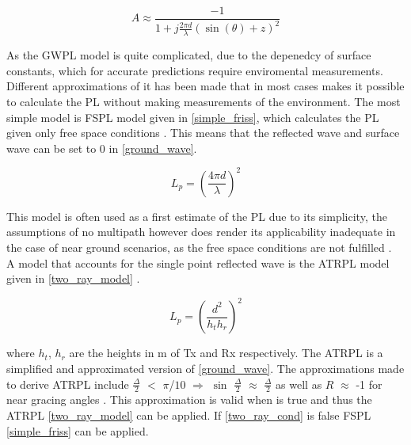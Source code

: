 \begin{equation}
A \approx \frac{-1}{1+j\frac{2\pi d}{\lambda}(\sin(\theta)+z)^{2}}
\label{attenuation_factor_A}
\end{equation}


As the GWPL model is quite complicated, due to the depenedcy of surface constants, which for accurate predictions require enviromental measurements. Different approximations of it has been made that in most cases makes it possible to calculate the PL without making measurements of the environment. The most simple model is FSPL model given in \eqref{simple_friss}, which calculates the PL given only free space conditions \cite{Chong}. This means that the reflected wave and surface wave can be set to 0 in \eqref{ground_wave}. 

\begin{equation}
L_p=\left(\frac{4 \pi d}{\lambda}\right)^2
\label{simple_friss}
\end{equation}

This model is often used as a first estimate of the PL due to its simplicity, the assumptions of no multipath however does render its applicability inadequate in the case of near ground scenarios, as the free space conditions are not fulfilled \cite{two_ray}. \\



A model that accounts for the single point reflected wave is the ATRPL model given in \eqref{two_ray_model} \cite{two_ray, Chong}. 

\begin{equation}
L_{p} = \left(\frac{d^2}{h_t h_r}\right)^2
\label{two_ray_model}
\end{equation}

where $h_t$, $h_r$ are the heights in m of Tx and Rx respectively. 
The ATRPL is a simplified and approximated version of \eqref{ground_wave}. The approximations made to derive ATRPL include $\frac{\Delta}{2}$ $<$ $\pi$/$10$ $\Rightarrow$ $\sin$ $\frac{\Delta}{2}$ $\approx$ $\frac{\Delta}{2}$ as well as $R$ $\approx$ -1 for near gracing angles \cite{Chong}. This approximation is valid when is true and thus the ATRPL \eqref{two_ray_model} can be applied. If \eqref{two_ray_cond} is false FSPL \eqref{simple_friss} can be applied.
  
